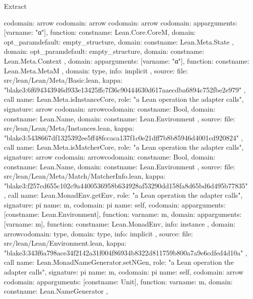 \begin{lexlean}{Extract}
\begin{toolingmodule}
{{{        codomain: arrow{
          codomain: arrow{
            codomain: arrow{
              codomain: app{arguments: [var{name: "α"}], function: const{name: Lean.Core.CoreM}},
              domain: opt_param{default: empty_structure{}, domain: const{name: Lean.Meta.State}}
            },
            domain: opt_param{default: empty_structure{}, domain: const{name: Lean.Meta.Context}}
          },
          domain: app{arguments: [var{name: "α"}], function: const{name: Lean.Meta.MetaM}}
        },
        domain: type{},
        info: implicit
      },
      source: {
        file: src/lean/Lean/Meta/Basic.lean,
        kappa: "blake3:6f694343946d933e13425ffc7f36c90444630d617aaecdba6894c752fbe2e979"
      }
    },
    call{
      name: Lean.Meta.isInstanceCore,
      role: "a Lean operation the adapter calls",
      signature: arrow{
        codomain: arrow{codomain: const{name: Bool}, domain: const{name: Lean.Name}},
        domain: const{name: Lean.Environment}
      },
      source: {
        file: src/lean/Lean/Meta/Instances.lean,
        kappa: "blake3:5438667df1325392ee5ff48fccaca137f1c0e21dff7b8b85946d4001cd920824"
      }
    },
    call{
      name: Lean.Meta.isMatcherCore,
      role: "a Lean operation the adapter calls",
      signature: arrow{
        codomain: arrow{codomain: const{name: Bool}, domain: const{name: Lean.Name}},
        domain: const{name: Lean.Environment}
      },
      source: {
        file: src/lean/Lean/Meta/Match/MatcherInfo.lean,
        kappa: "blake3:f257cd655c102c9a4400536958b634928af53290dd158fa8d65bd6d495b77835"
      }
    },
    call{
      name: Lean.MonadEnv.getEnv,
      role: "a Lean operation the adapter calls",
      signature: pi{
        name: m,
        codomain: pi{
          name: self,
          codomain: app{arguments: [const{name: Lean.Environment}], function: var{name: m}},
          domain: app{arguments: [var{name: m}], function: const{name: Lean.MonadEnv}},
          info: instance
        },
        domain: arrow{codomain: type{}, domain: type{}},
        info: implicit
      },
      source: {
        file: src/lean/Lean/Environment.lean,
        kappa: "blake3:343f6a798ace34f2142a31f004f86934b8322d811759b800a7a9e6cdfed4d10a"
      }
    },
    call{
      name: Lean.MonadNameGenerator.setNGen,
      role: "a Lean operation the adapter calls",
      signature: pi{
        name: m,
        codomain: pi{
          name: self,
          codomain: arrow{
            codomain: app{arguments: [const{name: Unit}], function: var{name: m}},
            domain: const{name: Lean.NameGenerator}
          },
}}}}
\end{toolingmodule}
\end{lexlean}
